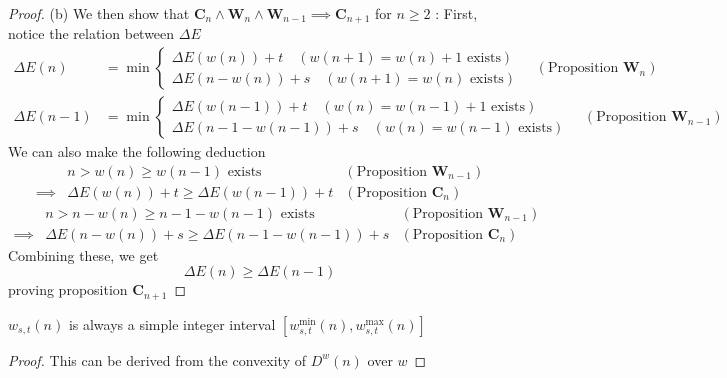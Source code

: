 \documentclass[]{article}
\begin{document}
\begin{proof}
\vspace{0.3cm}
(b) We then show that $\mathbf{C}_{n} \land \mathbf{W}_n \land \mathbf{W}_{n-1} \implies \mathbf{C}_{n+1}$ for $n\ge 2$ :
First, notice the relation between $\Delta E$
\begin{align*}
\Delta E(n)&= \min\begin{cases}
	\Delta E(w(n)) + t \quad(w(n+1) = w(n) + 1 \text{ exists})\\
	\Delta E(n-w(n)) + s\quad(w(n+1) = w(n) \text{ exists})
\end{cases} \quad (\text{Proposition $\mathbf{W}_n$}) \\	
\Delta E(n-1)&= \min\begin{cases}
\Delta E(w(n-1)) + t \quad(w(n) = w(n-1) + 1\text{ exists})\\
\Delta E(n-1-w(n-1)) + s\quad(w(n) = w(n-1)\text{ exists})
\end{cases} \quad (\text{Proposition $\mathbf{W}_{n-1}$}) 	
\end{align*}
We can also make the following deduction
\begin{align*}
	&n > w(n)\geq w(n-1)  \text{ exists}  &(\text{Proposition $\mathbf{W}_{n-1}$})\\
	\implies& \Delta E(w(n)) + t \geq  \Delta E(w(n-1)) + t &(\text{Proposition $\mathbf{C}_n$})
\end{align*}
\begin{align*}
&n>n-w(n)\geq n-1-w(n-1)  \text{ exists}  &(\text{Proposition $\mathbf{W}_{n-1}$})\\
\implies& \Delta E(n-w(n)) + s \geq \Delta E(n-1-w(n-1)) + s &(\text{Proposition $\mathbf{C}_n$})
\end{align*}
Combining these, we get
\[
\Delta E(n)\geq \Delta E(n-1)
\]
proving proposition $\mathbf{C}_{n+1}$

\end{proof}

\vspace{1cm}
\begin{lemma}[$w$-range]
	$w_{s,t}(n)$ is always a simple integer interval $[w_{s,t}^{\min}(n), w_{s,t}^{\max}(n)]$
\end{lemma}
\begin{proof}
	This can be derived from the convexity of $D^w(n)$ over $w$
\end{proof}
\end{document}
